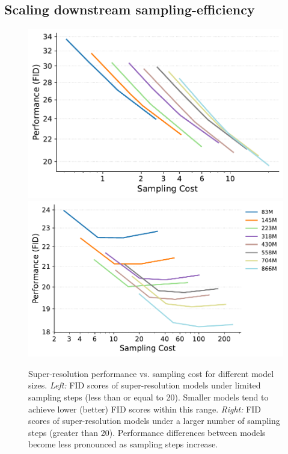 \subsection{Scaling downstream sampling-efficiency}
\label{sec:scalingsamplingsr}


\begin{figure}[t]
    \centering
    \def\xwidth{.315\linewidth}
    \includegraphics[height=\xwidth]{cp2/figures/sr_fid_cost_l_20steps.pdf}
    \includegraphics[height=\xwidth]{cp2/figures/sr_fid_cost_g_50steps.pdf}
    \caption{Super-resolution performance vs. sampling cost for different model sizes. \emph{Left:} FID scores of super-resolution models under limited sampling steps (less than or equal to 20). Smaller models tend to achieve lower (better) FID scores within this range.
    \emph{Right:} FID scores of super-resolution models under a larger number of sampling steps (greater than 20).
    Performance differences between models become less pronounced as sampling steps increase.
    }
    \label{fig:sroptiamlrules}
\end{figure}


